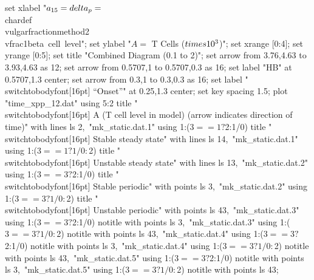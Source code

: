   set xlabel "$a_{15} = \\delta_p = $\\chardef\\vulgarfractionmethod2\\vfrac1{beta~cell~level}";
  set ylabel "$A = $ T Cells ($\\times 10^3$)";
  set xrange [0:4];
  set yrange [0:5];
  set title "Combined Diagram (0.1 to 2)";
  set arrow from 3.76,4.63 to 3.93,4.63 as 12;
  set arrow from 0.5707,1 to 0.5707,0.3 as 16;
  set label "HB" at 0.5707,1.3 center;
  set arrow from 0.3,1 to 0.3,0.3 as 16;
  set label "\\switchtobodyfont[16pt] “Onset”" at 0.25,1.3 center;
  set key spacing 1.5;
  plot "time_xpp_12.dat" using 5:2 title "\\switchtobodyfont[16pt] A (T cell level in model) (arrow indicates direction of time)" with lines ls 2,\
       "mk_static.dat.1" using 1:($3==1?$2:1/0) title "\\switchtobodyfont[16pt] Stable steady state" with lines ls 14,\
       "mk_static.dat.1" using 1:($3==1?1/0:$2) title "\\switchtobodyfont[16pt] Unstable steady state" with lines ls 13,\
       "mk_static.dat.2" using 1:($3==3?$2:1/0) title "\\switchtobodyfont[16pt] Stable periodic" with points ls 3,\
       "mk_static.dat.2" using 1:($3==3?1/0:$2) title "\\switchtobodyfont[16pt] Unstable periodic" with points ls 43,\
       "mk_static.dat.3" using 1:($3==3?$2:1/0) notitle with points ls 3,\
       "mk_static.dat.3" using 1:($3==3?1/0:$2) notitle with points ls 43,\
       "mk_static.dat.4" using 1:($3==3?$2:1/0) notitle with points ls 3,\
       "mk_static.dat.4" using 1:($3==3?1/0:$2) notitle with points ls 43,\
       "mk_static.dat.5" using 1:($3==3?$2:1/0) notitle with points ls 3,\
       "mk_static.dat.5" using 1:($3==3?1/0:$2) notitle with points ls 43;
\stopGNUPLOTscript

